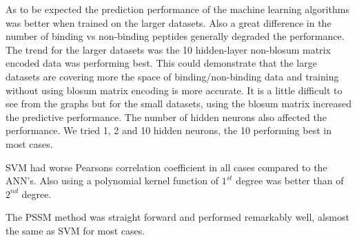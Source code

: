 As to be expected the prediction performance of the machine learning algorithms was better when trained on the larger datasets.
Also a great difference in the number of binding vs non-binding peptides generally degraded the performance.
The trend for the larger datasets was the 10 hidden-layer non-blosum matrix encoded data was performing best. 
This could demonstrate that the large datasets are covering more the space of binding/non-binding data and training without using blosum matrix encoding is more accurate.
It is a little difficult to see from the graphs but for the small datasets, using the blosum matrix increased the predictive performance.
The number of hidden neurons also affected the performance. We tried 1, 2 and 10 hidden neurons, the 10 performing best in most cases.

SVM had worse Pearsons correlation coefficient in all cases compared to the ANN's. Also using a polynomial kernel function of $1^{st}$ degree was better than of $2^{nd}$ degree.

The PSSM method was straight forward and performed remarkably well, alsmost the same as SVM for most cases.
